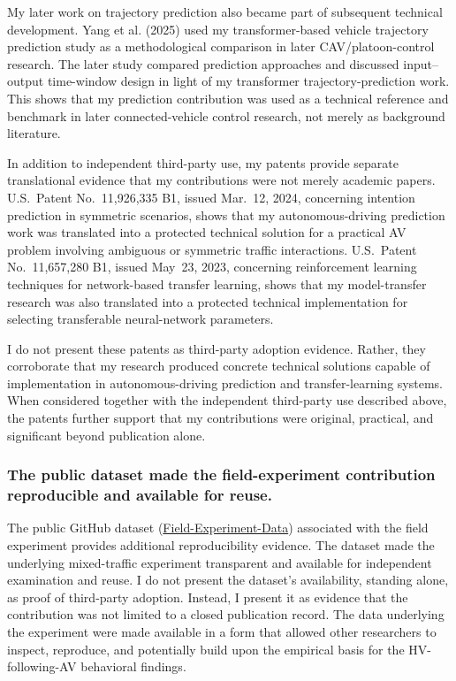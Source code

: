 \documentclass[11pt,letterpaper]{article}
\begin{document}
My later work on trajectory prediction also became part of subsequent technical development. Yang et al. (2025) used my transformer-based vehicle trajectory prediction study as a methodological comparison in later CAV/platoon-control research. The later study compared prediction approaches and discussed input--output time-window design in light of my transformer trajectory-prediction work. This shows that my prediction contribution was used as a technical reference and benchmark in later connected-vehicle control research, not merely as background literature.

In addition to independent third-party use, my patents provide separate translational evidence that my contributions were not merely academic papers. U.S.\ Patent No.~11,926,335 B1, issued Mar.~12, 2024, concerning intention prediction in symmetric scenarios, shows that my autonomous-driving prediction work was translated into a protected technical solution for a practical AV problem involving ambiguous or symmetric traffic interactions. U.S.\ Patent No.~11,657,280 B1, issued May~23, 2023, concerning reinforcement learning techniques for network-based transfer learning, shows that my model-transfer research was also translated into a protected technical implementation for selecting transferable neural-network parameters.

I do not present these patents as third-party adoption evidence. Rather, they corroborate that my research produced concrete technical solutions capable of implementation in autonomous-driving prediction and transfer-learning systems. When considered together with the independent third-party use described above, the patents further support that my contributions were original, practical, and significant beyond publication alone.

\subsubsection{The public dataset made the field-experiment contribution reproducible and available for reuse.}

The public GitHub dataset (\href{https://github.com/sgzzgit/Field-Experiment-Data}{Field-Experiment-Data}) associated with the field experiment provides additional reproducibility evidence. The dataset made the underlying mixed-traffic experiment transparent and available for independent examination and reuse. I do not present the dataset's availability, standing alone, as proof of third-party adoption. Instead, I present it as evidence that the contribution was not limited to a closed publication record. The data underlying the experiment were made available in a form that allowed other researchers to inspect, reproduce, and potentially build upon the empirical basis for the HV-following-AV behavioral findings.
\end{document}
